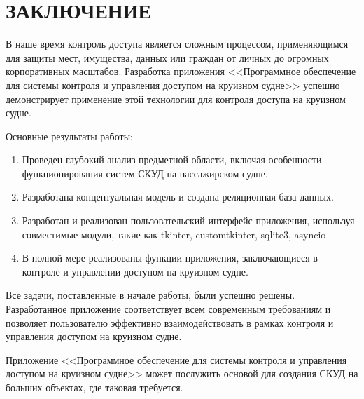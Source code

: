 \section*{ЗАКЛЮЧЕНИЕ}

В наше время контроль доступа является сложным процессом, применяющимся для защиты мест, имущества, данных или граждан от личных до огромных корпоративных масштабов. Разработка приложения <<Программное обеспечение для системы контроля и управления доступом на круизном судне>> успешно демонстрирует применение этой технологии для контроля доступа на круизном судне.

Основные результаты работы:
\begin{enumerate}
	\item Проведен глубокий анализ предметной области, включая особенности функционирования систем СКУД на пассажирском судне.
	\item Разработана концептуальная модель и создана реляционная база данных.
	\item Разработан и реализован пользовательский интерфейс приложения, используя совместимые модули, такие как tkinter, customtkinter, sqlite3, asyncio
	\item В полной мере реализованы функции приложения, заключающиеся в контроле и управлении доступом на круизном судне.
\end{enumerate}
  
Все задачи, поставленные в начале работы, были успешно решены. Разработанное приложение соответствует всем современным требованиям и позволяет пользователю эффективно взаимодействовать в рамках контроля и управления доступом на круизном судне. 

Приложение <<Программное обеспечение для системы контроля и управления доступом на круизном судне>> может послужить основой для создания СКУД на больших объектах, где таковая требуется.
